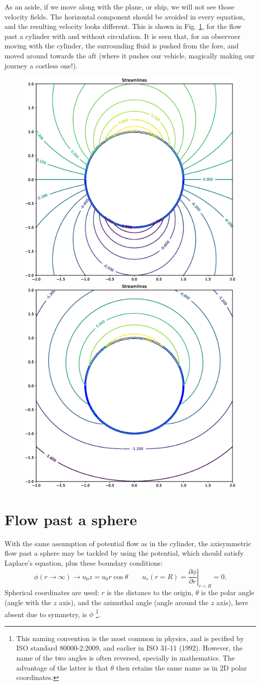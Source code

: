 As an aside, if we move along with the plane, or ship, we will not see
those velocity fields. The horizontal component should be avoided in
every equation, and the resulting velocity looks different. This is
shown in Fig. \ref{fig:potential_flow_past_cylinder_moving}, for the
flow past a cylinder with and without circulation. It is seen that,
for an observoer moving with the cylinder, the surrounding fluid is
pushed from the fore, and moved around towards the aft (where it
pushes our vehicle, magically making our journey a costless one!).

\begin{figure}
  \centering
  \includegraphics[width=0.4\linewidth]{figures/potential_flow_past_cylinder_moving}
  \includegraphics[width=0.4\linewidth]{figures/potential_flow_past_cylinder_rotating_moving}
  \caption{\label{fig:potential_flow_past_cylinder_moving}}
\end{figure}


\section{Flow past a sphere}

With the same assumption of potential flow as in the cylinder, the
axisymmetric flow past a sphere may be tackled by using the potential,
which should satisfy Laplace's equation, plus these boundary
conditions:
\[
  \phi (r\to \infty) \to u_0 z = u_0 r \cos\theta \qquad
  u_r(r=R) =\left. \frac{\partial \phi}{\partial r} \right|_{r=R} = 0 .
\]
Spherical coordinates  are used:
$r$ is the distance to the origin, $\theta$ is the polar angle (angle
with the $z$ axis), and the azimuthal angle (angle around the $z$
axis), here absent due to symmetry, is $\phi$ %
\footnote{This naming convention is the most common in physics, and is
  pecified by ISO standard 80000-2:2009, and earlier in ISO 31-11
  (1992). However, the name of the two angles is often reversed,
  specially in mathematics. The advantage of the latter is that
  $\theta$ then retains the same name as in 2D polar coordinates.}.


